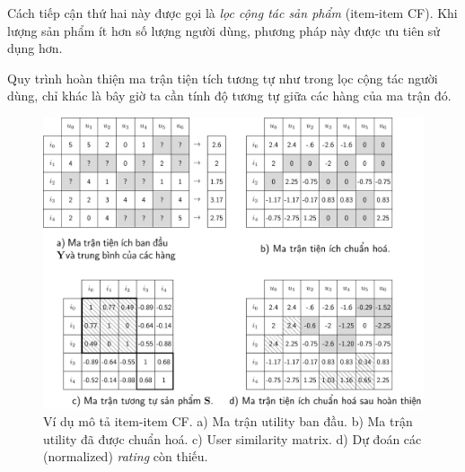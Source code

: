 Cách tiếp cận thứ hai này được gọi là \textit{lọc cộng tác sản phẩm} ({item-item CF}). Khi lượng sản phẩm ít hơn số lượng người dùng, phương
pháp này được ưu tiên sử dụng hơn.

Quy trình hoàn thiện ma trận tiện tích tương tự như trong lọc cộng tác người dùng, chỉ khác là bây giờ ta cần tính độ tương tự giữa các hàng của ma trận đó.

\begin{figure}[t]
\centering
\includegraphics[width = \textwidth]{Chapters/06_RecommendationSystems/24_collaborativefiltering/latex/item_cf_gray.pdf}
\caption[]{Ví dụ mô tả item-item CF. a) Ma trận utility
ban đầu. b) Ma trận utility  đã được chuẩn hoá. c) User similarity matrix.
d) Dự đoán các (normalized) \textit{rating} còn thiếu.}
\label{fig:24_3}
\end{figure}

